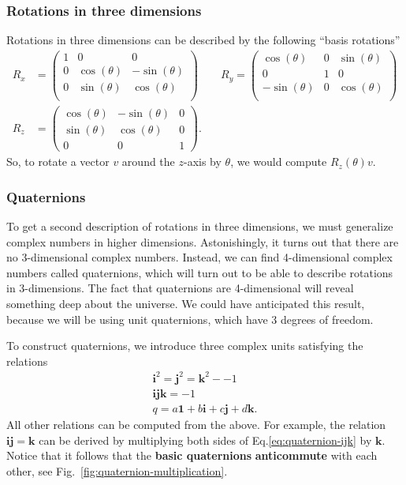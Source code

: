 \documentclass[11pt]{article}
\numberwithin{equation}{section}
\begin{document}
\subsubsection{Rotations in three dimensions}
Rotations in three dimensions can be described by the following ``basis rotations''
\begin{align}
R_x &= \begin{pmatrix}
1 & 0 & 0 \\
0 & \cos(\theta) & -\sin(\theta) \\
0 & \sin(\theta) & \cos(\theta) \\
\end{pmatrix} \qquad 
R_y = \begin{pmatrix}
\cos(\theta) & 0 & \sin(\theta) \\
0 & 1 & 0 \\
-\sin(\theta) & 0 & \cos(\theta) \\
\end{pmatrix} \nonumber \\
R_z &= \begin{pmatrix}
\cos(\theta) & -\sin(\theta) & 0 \\
\sin(\theta) & \cos(\theta) & 0 \\
0 & 0 & 1
\end{pmatrix}.
\end{align}
So, to rotate a vector $v$ around the $z$-axis by $\theta$, we would compute $R_z(\theta) v$. 

\subsubsection{Quaternions}
To get a second description of rotations in three dimensions, we must generalize complex numbers in higher dimensions. Astonishingly, it turns out that there are no 3-dimensional complex numbers. Instead, we can find 4-dimensional complex numbers called quaternions, which will turn out to be able to describe rotations in 3-dimensions. The fact that quaternions are 4-dimensional will reveal something deep about the universe. We could have anticipated this result, because we will be using unit quaternions, which have 3 degrees of freedom.

To construct quaternions, we introduce three complex units satisfying the relations
\begin{align}
\mathbf{i}^2 = \mathbf{j}^2 = \mathbf{k}^2 - -1 \\
\mathbf{ijk} = -1 \\
q = a \mathbf{1} + b\mathbf{i} + c \mathbf{j} + d \mathbf{k}. \label{eq:quaternion-ijk}
\end{align}
All other relations can be computed from the above. For example, the relation $\mathbf{ij}=\mathbf{k}$ can be derived by multiplying both sides of Eq.\eqref{eq:quaternion-ijk} by $\mathbf{k}$. Notice that it follows that the \textbf{basic quaternions} \textbf{anticommute} with each other, see Fig.~\ref{fig:quaternion-multiplication}.
\end{document}
